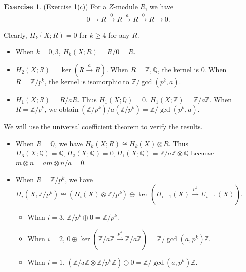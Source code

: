 \documentclass[12pt, psamsfonts]{amsart}
\theoremstyle{definition}
\newtheorem*{exer}{Exercise}
\theoremstyle{remark}
\numberwithin{equation}{section}
\begin{document}
\begin{exer}{(Exercise 1(c))}
  For a $Z$-module $R$, we have
  \begin{align*}
    0 \rightarrow R \xrightarrow{0} R \xrightarrow{a} R \xrightarrow{0} R \rightarrow 0.
  \end{align*}

  Clearly, $H_k(X; R) = 0$ for $k \geq 4$ for any $R$.
  \begin{itemize}
    \item
      When $k = 0, 3$, $H_k(X; R) = R / 0 = R$.
    \item
      $H_2(X; R) = \ker(R \xrightarrow{a} R)$.
      When $R = \mathbb{Z}, \mathbb{Q}$, the kernel is 0.
      When $R = \mathbb{Z} / p^k$, the kernel is isomorphic to $\mathbb{Z} / \gcd(p^k, a)$.
    \item
      $H_1(X; R) = R / aR$.
      Thus $H_1(X; \mathbb{Q}) = 0$.
      $H_1(X; \mathbb{Z}) = \mathbb{Z} / a\mathbb{Z}$.
      When $R = \mathbb{Z} / p^k$, we obtain $(\mathbb{Z} / p^k) / a(\mathbb{Z} / p^k) = \mathbb{Z} / \gcd(p^k, a)$.
  \end{itemize}

  We will use the universal coefficient theorem to verify the results.
  \begin{itemize}
    \item
      When $R = \mathbb{Q}$, we have $H_k(X; R) \cong H_k(X) \otimes R$.
      Thus $H_3(X; \mathbb{Q}) = \mathbb{Q}, H_2(X; \mathbb{Q}) = 0, H_1(X; \mathbb{Q}) = \mathbb{Z}/a\mathbb{Z} \otimes \mathbb{Q}$ because $m \otimes n = am \otimes n/a = 0$.
    \item
      When $R = \mathbb{Z} / p^k$, we have $H_i(X; \mathbb{Z} / p^k) \cong (H_i(X) \otimes \mathbb{Z} / p^k) \oplus \ker(H_{i - 1}(X) \xrightarrow{p^k} H_{i - 1}(X))$.
      \begin{itemize}
        \item
          When $i = 3$, $\mathbb{Z} / p^k \oplus 0 = \mathbb{Z} / p^k$.
        \item
          When $i = 2$, $0 \oplus \ker(\mathbb{Z} / a\mathbb{Z} \xrightarrow{p^k} \mathbb{Z} / a\mathbb{Z}) = \mathbb{Z} / \gcd(a, p^k)\mathbb{Z}$.
        \item
          When $i = 1$, $(\mathbb{Z} / a\mathbb{Z} \otimes \mathbb{Z} / p^k\mathbb{Z}) \oplus 0 = \mathbb{Z} / \gcd(a, p^k)\mathbb{Z}$.
      \end{itemize}
  \end{itemize}
\end{exer}
\end{document}
